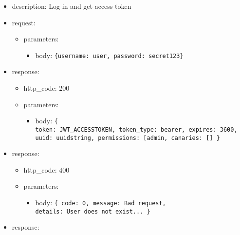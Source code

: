 \documentclass[
]{article}
\begin{document}
\begin{itemize}
\item
  description: Log in and get access token
\item
  request:

  \begin{itemize}
  \item
    parameters:

    \begin{itemize}
    \item
      body:
      \texttt{\{\textquotesingle{}username\textquotesingle{}:\ \textquotesingle{}user\textquotesingle{},\ \textquotesingle{}password\textquotesingle{}:\ \textquotesingle{}secret123\textquotesingle{}\}}
    \end{itemize}
  \end{itemize}
\item
  response:

  \begin{itemize}
  \item
    http\_code: 200
  \item
    parameters:

    \begin{itemize}
    \item
      body: \texttt{\{
      \textquotesingle{}token\textquotesingle{}:\ \textquotesingle{}JWT\_ACCESSTOKEN\textquotesingle{},\ 
      \textquotesingle{}token\_type\textquotesingle{}:\ \textquotesingle{}bearer\textquotesingle{},\ 
      \textquotesingle{}expires\textquotesingle{}:\ 3600,
      \textquotesingle{}uuid\textquotesingle{}:\ \textquotesingle{}uuidstring\textquotesingle{},\ 
      \textquotesingle{}permissions\textquotesingle{}:\ {[}\textquotesingle{}admin\textquotesingle{}{]},
      \textquotesingle{}canaries\textquotesingle{}:\ {[}{]}
      \}}
    \end{itemize}
  \end{itemize}
\item
  response:

  \begin{itemize}
  \item
    http\_code: 400
  \item
    parameters:

    \begin{itemize}
    \item
      body: \texttt{\{
      \textquotesingle{}code\textquotesingle{}:\ 0,
      \textquotesingle{}message\textquotesingle{}:\ \textquotesingle{}Bad\ request\textquotesingle{},
      \textquotesingle{}details\textquotesingle{}:\ \textquotesingle{}User\ does\ not\ exist...\textquotesingle{}
      \}}
    \end{itemize}
  \end{itemize}
\item
  response:


\end{itemize}
\end{document}
